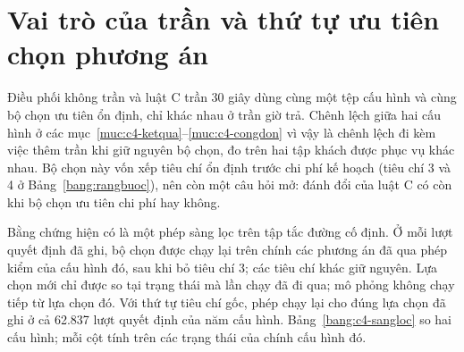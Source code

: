 
\section{Vai trò của trần và thứ tự ưu tiên chọn phương án}
\label{muc:c4-vaitro}

Điều phối không trần và luật C trần 30 giây dùng cùng một tệp cấu hình và cùng bộ chọn ưu tiên ổn định, chỉ
khác nhau ở trần giờ trả. Chênh lệch giữa hai cấu hình ở các mục~\ref{muc:c4-ketqua}--\ref{muc:c4-congdon} vì
vậy là chênh lệch đi kèm việc thêm trần khi giữ nguyên bộ chọn, đo trên hai tập khách được phục vụ khác nhau.
Bộ chọn này vốn xếp tiêu chí ổn định trước chi phí kế hoạch (tiêu chí 3 và 4 ở Bảng~\ref{bang:rangbuoc}), nên
còn một câu hỏi mở: đánh đổi của luật C có còn khi bộ chọn ưu tiên chi phí hay không.

Bằng chứng hiện có là một phép sàng lọc trên tập tắc đường cố định. Ở mỗi lượt quyết định đã ghi, bộ chọn được
chạy lại trên chính các phương án đã qua phép kiểm của cấu hình đó, sau khi bỏ tiêu chí 3; các tiêu chí khác giữ
nguyên. Lựa chọn mới chỉ được so tại trạng thái mà lần chạy đã đi qua; mô phỏng không chạy tiếp từ lựa chọn đó.
Với thứ tự tiêu chí gốc, phép chạy lại cho đúng lựa chọn đã ghi ở cả 62.837 lượt quyết định của năm cấu hình.
Bảng~\ref{bang:c4-sangloc} so hai cấu hình; mỗi cột tính trên các trạng thái của chính cấu hình đó.

